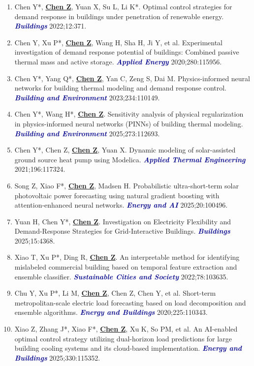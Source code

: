 \documentclass[11pt,a4paper]{article}
\newcommand{\me}[1]{\underline{\textbf{#1}}}
\newcommand{\journal}[1]{\textcolor{darkblue}{\textbf{\textit{#1}}}}
\begin{document}
\begin{enumerate}
\item Chen Y*, \me{Chen Z}, Yuan X, Su L, Li K*. Optimal control strategies for demand response in buildings under penetration of renewable energy. \journal{Buildings} 2022;12:371.

\item Chen Y, Xu P*, \me{Chen Z}, Wang H, Sha H, Ji Y, et al. Experimental investigation of demand response potential of buildings: Combined passive thermal mass and active storage. \journal{Applied Energy} 2020;280:115956.

\item Chen Y*, Yang Q*, \me{Chen Z}, Yan C, Zeng S, Dai M. Physics-informed neural networks for building thermal modeling and demand response control. \journal{Building and Environment} 2023;234:110149.

\item Chen Y*, Wang H*, \me{Chen Z}. Sensitivity analysis of physical regularization in physics-informed neural networks (PINNs) of building thermal modeling. \journal{Building and Environment} 2025;273:112693.

\item Chen Y*, Chen Z, \me{Chen Z}, Yuan X. Dynamic modeling of solar-assisted ground source heat pump using Modelica. \journal{Applied Thermal Engineering} 2021;196:117324.

\item Song Z, Xiao F*, \me{Chen Z}, Madsen H. Probabilistic ultra-short-term solar photovoltaic power forecasting using natural gradient boosting with attention-enhanced neural networks. \journal{Energy and AI} 2025;20:100496.

\item Yuan H, Chen Y*, \me{Chen Z}. Investigation on Electricity Flexibility and Demand-Response Strategies for Grid-Interactive Buildings. \journal{Buildings} 2025;15:4368.

\item Xiao T, Xu P*, Ding R, \me{Chen Z}. An interpretable method for identifying mislabeled commercial building based on temporal feature extraction and ensemble classifier. \journal{Sustainable Cities and Society} 2022;78:103635.

\item Chu Y, Xu P*, Li M, \me{Chen Z}, Chen Z, Chen Y, et al. Short-term metropolitan-scale electric load forecasting based on load decomposition and ensemble algorithms. \journal{Energy and Buildings} 2020;225:110343.

\item Xiao Z, Zhang J*, Xiao F*, \me{Chen Z}, Xu K, So PM, et al. An AI-enabled optimal control strategy utilizing dual-horizon load predictions for large building cooling systems and its cloud-based implementation. \journal{Energy and Buildings} 2025;330:115352.


\end{enumerate}
\end{document}
